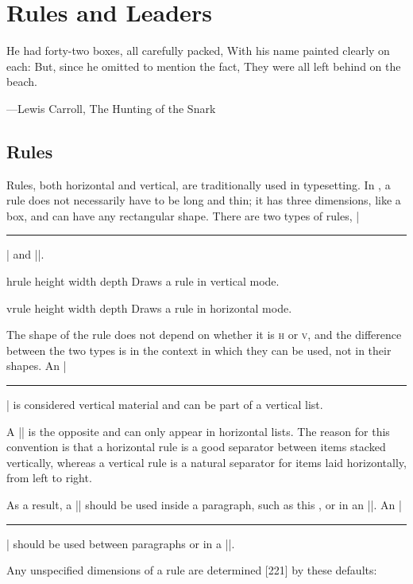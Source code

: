 
\chapter{Rules and Leaders}
\pagestyle{headings}

\epigraph{He had forty-two boxes, all carefully packed,
With his name painted clearly on each:
But, since he omitted to mention the fact,
They were all left behind on the beach.}{---Lewis Carroll, The Hunting of the Snark}

\section{Rules}

Rules, both horizontal and vertical, are traditionally used in typesetting. In
\tex, a rule does not necessarily have to be long and thin; it has three dimensions,
like a box, and can have any rectangular shape. There are two types of rules, |\hrule| and |\vrule|.

\begin{docCommand}{hrule}{ height width  depth }
Draws a rule in vertical mode.
\end{docCommand}

\begin{docCommand}{vrule}{ height width  depth }
Draws a rule in horizontal mode.
\end{docCommand}

The shape of the rule does not depend on whether it is \textsc{h} or \textsc{v}, and the difference
between the two types is in the context in which they can be used, not in their
shapes. An |\hrule| is considered vertical material and can be part of a vertical list.

A |\vrule| is the opposite and can only appear in horizontal lists. The reason for
this convention is that a horizontal rule is a good separator between items stacked
vertically, whereas a vertical rule is a natural separator for items laid horizontally,
from left to right.

As a result, a |\vrule| should be used inside a paragraph, such as this \vrule, or in
an |\hbox|. An |\hrule| should be used between paragraphs or in a |\vbox|.

Any unspecified dimensions of a rule are determined [221] by these defaults:

